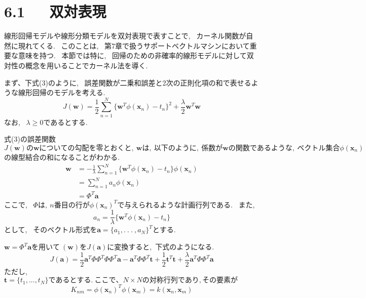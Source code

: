 \documentclass[11pt,a4paper]{jreport}
\begin{document}
\section*{6.1~~~双対表現}
線形回帰モデルや線形分類モデルを双対表現で表すことで,~ カーネル関数が自然に現れてくる.~ このことは,~ 第7章で扱うサポートベクトルマシンにおいて重要な意味を持つ.~ 本節では特に,~ 回帰のための非確率的線形モデルに対して双対性の概念を用いることでカーネル法を導く.~ \par
まず、下式(3)のように,~ 誤差関数が二乗和誤差と2次の正則化項の和で表せるような線形回帰のモデルを考える.~
\begin{equation}
  J(\textbf{w}) = \frac{1}{2} \sum_{n=1}^{N} \{\textbf{w}^T \phi (\textbf{x}_n)-t_n\}^2 + \frac{\lambda}{2}\textbf{w}^T\textbf{w}
\end{equation}
なお,~ $\lambda\geq0$であるとする.~\par
式(3)の誤差関数$J(\textbf{w})の\textbf{w}についての勾配を零とおくと,~ \textbf{w}は,~ 以下のように,~ 係数が\textbf{w}の関数であるような,~ ベクトル集合\phi(\textbf{x}_n)$の線型結合の和になることがわかる.~
\begin{equation}
  \begin{split}
    \textbf{w}&=-\frac{1}{\lambda}\sum_{n=1}^{N} \{\textbf{w}^T \phi (\textbf{x}_n)-t_n\} \phi (\textbf{x}_n)\\
    &= \sum_{n=1}^{N} a_n \phi (\textbf{x}_n)\\
    &= \Phi^T\textbf{a}
  \end{split}
\end{equation}
ここで,~ $ \Phi は,~ n番目の行が\phi(\textbf{x}_n)^Tで$与えられるような計画行列である.~ また,~
\begin{equation}
  a_n = \frac{1}{\lambda} \{ \textbf{w}^T\phi(\textbf{x}_n) - t_n\}
\end{equation}
として,~ そのベクトル形式を$\textbf{a}=\{ a_1,.~.~.~,a_N\}^Tとする.~$\par
$\textbf{w} = \Phi^T\textbf{a}を用いて~(\textbf{w})をJ(\textbf{a})$に変換すると,~下式のようになる.
\begin{equation}
  J(\textbf{a}) = \frac{1}{2}\textbf{a}^T\Phi\Phi^T\Phi\Phi^T\textbf{a}-\textbf{a}^T\Phi\Phi^T\textbf{t}+\frac{1}{2}\textbf{t}^T\textbf{t}+\frac{\lambda}{2}\textbf{a}^T\Phi\Phi^T\textbf{a}
\end{equation}
ただし,~$\textbf{t} = \{ t_1,...,t_N\}であるとする.~ここで、 N \times N の対称行列であり, その要素が$
\begin{equation}
  K_{nm} = \phi(\textbf{x}_n)^T \phi(\textbf{x}_m)= k(\textbf{x}_n, \textbf{x}_m)
\end{equation}
\end{document}
